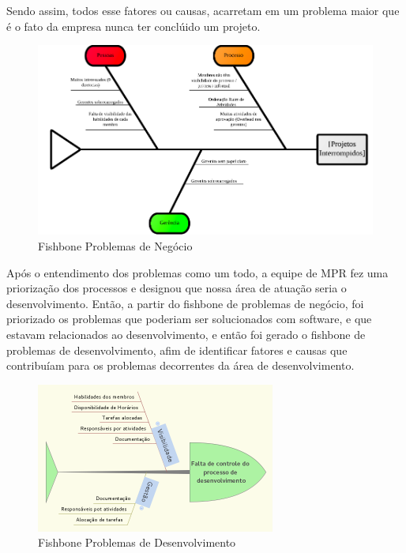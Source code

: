 	Sendo assim, todos esse fatores ou causas, acarretam em um problema maior que é o fato da empresa nunca ter conclúido um projeto.

  \begin{figure}[H]
    \center
    \includegraphics[width=1.0\textwidth]{figuras/fishbone-mpr}
    \caption{Fishbone Problemas de Negócio}
    \label{fig:fishbone_mpr}
  \end{figure}



  Após o entendimento dos problemas como um todo, a equipe de MPR fez uma priorização dos processos e designou que nossa área de atuação seria o desenvolvimento. Então, a partir do fishbone de problemas de negócio, foi priorizado os problemas que poderiam ser solucionados com software, e que estavam relacionados ao desenvolvimento, e então foi gerado o fishbone de problemas de desenvolvimento, afim de identificar fatores e causas que contribuíam para os problemas decorrentes da área de desenvolvimento.

  \begin{figure}[H]
    \center
    \includegraphics[width=0.7\textwidth]{figuras/fishbone-requisitos}
    \caption{Fishbone Problemas de Desenvolvimento}
    \label{fig:fishbone_requisitos}
  \end{figure}

